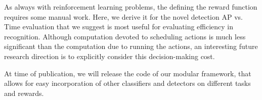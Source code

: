 \documentclass{article} %
\begin{document}
As always with reinforcement learning problems, the defining the reward function requires some manual work.
Here, we derive it for the novel detection AP vs. Time evaluation that we suggest is most useful for evaluating efficiency in recognition.
Although computation devoted to scheduling actions is much less significant than the computation due to running the actions, an interesting future research direction is to explicitly consider this decision-making cost.

At time of publication, we will release the code of our modular framework, that allows for easy incorporation of other classifiers and detectors on different tasks and rewards.


\renewcommand\bibsection{\subsubsection*{\refname}}

\small{
  
}
\end{document}
